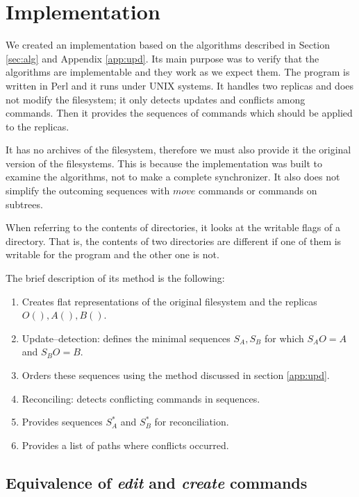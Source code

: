 \section{Implementation}
\label{app:impl}

We created an implementation based on the algorithms described in Section
\ref{sec:alg} and Appendix \ref{app:upd}. Its main purpose was to
verify that the algorithms are implementable and they work as we expect
them. The program is written in Perl and it runs under UNIX
systems. It handles two replicas and does not modify the filesystem; it
only detects updates and conflicts among commands. Then it provides the
sequences of commands which should be applied to the replicas.

It has no archives of the filesystem, therefore we must also provide it
the original version of the filesystems. This is because the
implementation was built to examine the algorithms, not to make a complete
synchronizer. It also does not simplify the outcoming sequences with
\(move\) commands or commands on subtrees.

When referring to the contents of directories, it looks at the writable
flags of a directory. That is, the contents of two directories are
different if one of them is writable for the program and the other one is
not.

The brief description of its method is the following:
\begin{enumerate}
\item Creates flat representations of the original filesystem and the
replicas \(O(), A(), B()\).
\item Update--detection: defines the minimal sequences \(S_A, S_B\) for
which \(S_AO=A\) and
\(S_BO=B\).
\item Orders these sequences using the method discussed in 
section \ref{app:upd}.
\item Reconciling: detects conflicting commands in sequences.
\item Provides sequences \(S_A^*\) and \(S_B^*\) for
reconciliation.
\item Provides a list of paths where conflicts occurred.
\end{enumerate}

\subsection{Equivalence of \emph{edit} and \emph{create} commands} 

